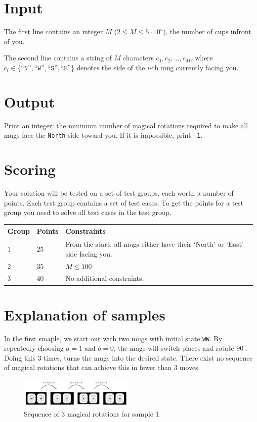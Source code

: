 \section*{Input}
The first line contains an integer $M$ ($2 \leq M \leq 5 \cdot 10^5$), the number of cups infront of you.

The second line contains a string of $M$ characters $c_1, c_2, \dots, c_M$, where $c_i \in \{\texttt{``N''},\texttt{``W''},\texttt{``S''},\texttt{``E''}\}$ denotes the side of the $i$-th mug currently facing you.

\section*{Output}
Print an integer: the minimum number of magical rotations required to make all mugs face the \texttt{North} side toward you. If it is impossible, print \texttt{-1}.

\section*{Scoring}
Your solution will be tested on a set of test groups, each worth a number of points. Each test group contains
a set of test cases. To get the points for a test group you need to solve all test cases in the test group.

\noindent
\begin{tabular}{| l | l | p{12cm} |}
  \hline
  \textbf{Group} & \textbf{Points} & \textbf{Constraints} \\ \hline
  $1$    & $25$       & From the start, all mugs either have their `North' or `East' side facing you. \\ \hline
  $2$    & $35$       & $M \leq 100$ \\ \hline
  $3$    & $40$       & No additional constraints. \\ \hline
\end{tabular}


\section*{Explanation of samples}
\noindent
In the first smaple, we start out with two mugs with initial state \texttt{WW}. 
By repeatedly choosing $a = 1$ and $b = 0$, the mugs will switch places and rotate $90^\circ$. Doing this 3 times, turns the mugs into the desired state. 
There exist no sequence of magical rotations that can achieve this in fewer than 3 moves.
\begin{figure}[h!]
  \centering
  \includegraphics[width=0.5\textwidth]{sample1.png}
  \caption{Sequence of 3 magical rotations for sample 1.}
\end{figure}



